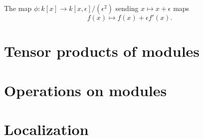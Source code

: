\begin{prop}
  The map $\phi: k[x] \to k[x,\epsilon]/(\epsilon^2)$ sending $ x \mapsto
  x+\epsilon $ maps \[ f(x) \mapsto f(x) + \epsilon f'(x). \]
\end{prop}

\section{Tensor products of modules}
\label{sec:tensor-products-of-modules}

\section{Operations on modules}
\label{sec:operations-on-modules}

\section{Localization}
\label{sec:localization}